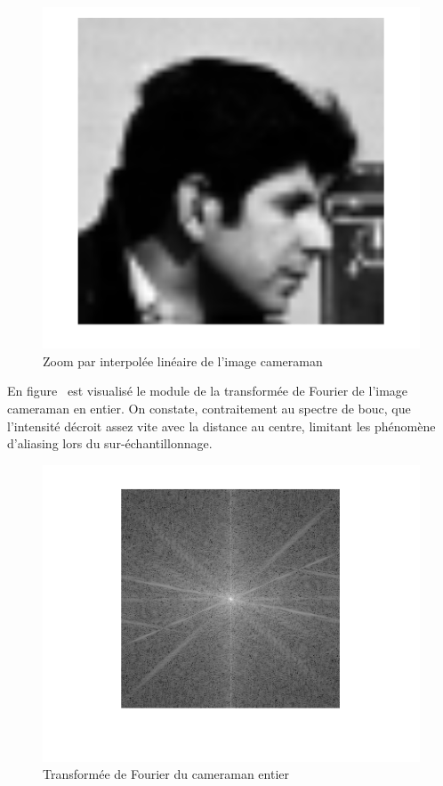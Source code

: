 \documentclass[12pt,a4paper,onecolumn]{article}
\begin{document}
\begin{figure}[H]
	\centering
	\includegraphics[height = 0.4\textheight]{cam_lin}
	\caption{Zoom par interpolée linéaire de l'image cameraman}
	\label{fig_cam_lin}
\end{figure}

En figure~ est visualisé le module de la transformée de Fourier de l'image cameraman en entier. On constate, contraitement au spectre de bouc, que l'intensité décroit assez vite avec la distance au centre, limitant les phénomène d'aliasing lors du sur-échantillonnage.
\begin{figure}[H]
	\centering
	\includegraphics[height = 0.4\textheight]{cam_ff}
	\caption{Transformée de Fourier du cameraman entier}
	\label{fig_ff_cam}
\end{figure}
\end{document}
